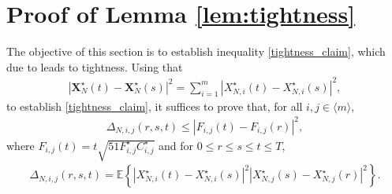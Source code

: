 \documentclass[11pt,reqno]{amsart}
\numberwithin{equation}{section}
\newcommand{\abs}[1]{\left\lvert #1 \right\rvert}
\newcommand{\sprod}[1]{\langle#1\rangle}
\newcommand{\E}[1]{\mathbb{E}\left\{ #1\right\}}
\newcommand{\nelem}[1]{{Lemma \ref{#1}}}
\newcommand{\kb}[1]{\boldsymbol{#1}}
\newcommand{\vk}[1]{\kb{#1}}
\begin{document}
\section{Proof of \nelem{lem:tightness}}\label{section:proof_of_tightness}
The objective of this section is to establish {inequality \eqref{tightness_claim}, which due to \cite[Theorem 13.5]{billingsley2013convergence} leads to tightness.}  Using that
\begin{align*}
    \abs{\vk X^{\star}_N(t)-\vk X^{\star}_N(s)}^2 = \sum_{i=1}^{m}\abs{X^{\star}_{N,i}(t)-X^{\star}_{N,i}(s)}^2,
\end{align*}
{to establish \eqref{tightness_claim}, it suffices to prove that, for all $i,j\in\sprod{m}$,}
\begin{align}
    \Delta_{N,i,j}(r,s,t) \leqslant \abs{F_{i,j}(t)-F_{i,j}(r)}^2,\label{tightness_separate_claim}
\end{align}
where $F_{i,j}(t) =t\sqrt{51F_{i,j}^{\star}C_{i,j}^{\star}}$
and {for $0\leqslant r\leqslant s\leqslant t\leqslant T$,}
\begin{align}
    \Delta_{N,i,j}(r,s,t) = \E{\abs{X^{\star}_{N,i}(t)- X^{\star}_{N,i}(s)}^2\abs{X^{\star}_{N,j}(s)-X^{\star}_{N,j}(r)}^2}.\label{Delta_def}
\end{align}
\end{document}
